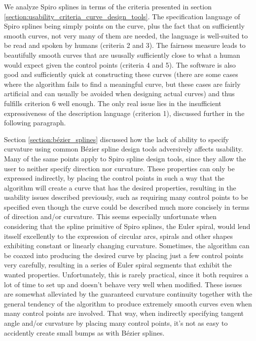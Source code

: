 \documentclass[a4paper]{article}
\begin{document}
				We analyze Spiro splines in terms of the criteria presented in section \ref{section:usability_criteria_curve_design_tools}. The specification language of Spiro splines being simply points on the curve, plus the fact that on sufficiently smooth curves, not very many of them are needed, the language is well-suited to be read and spoken by humans (criteria 2 and 3). The fairness measure leads to beautifully smooth curves that are ususally sufficiently close to what a human would expect given the control points (criteria 4 and 5). The software is also good and sufficiently quick at constructing these curves (there are some cases where the algorithm fails to find a meaningful curve, but these cases are fairly artificial and can usually be avoided when designing actual curves) and thus fulfills criterion 6 well enough. The only real issue lies in the insufficient expressiveness of the description language (criterion 1), discussed further in the following paragraph.

				Section \ref{section:bézier_splines} discussed how the lack of ability to specify curvature using common Bézier spline design tools adversively affects usability. Many of the same points apply to Spiro spline design tools, since they allow the user to neither specify direction nor curvature. These properties can only be expressed indirectly, by placing the control points in such a way that the algorithm will create a curve that has the desired properties, resulting in the usability issues described previously, such as requiring many control points to be specified even though the curve could be described much more concisely in terms of direction and/or curvature. This seems especially unfortunate when considering that the spline primitive of Spiro splines, the Euler spiral, would lend itsself excellently to the expression of circular arcs, spirals and other shapes exhibiting constant or linearly changing curvature. Sometimes, the algorithm can be coaxed into producing the desired curve by placing just a few control points very carefully, resulting in a series of Euler spiral segments that exhibit the wanted properties. Unfortunately, this is rarely practical, since it both requires a lot of time to set up and doesn't behave very well when modified. These issues are somewhat alleviated by the guaranteed curvature continuity together with the general tendency of the algorithm to produce extremely smooth curves even when many control points are involved. That way, when indirectly specifying tangent angle and/or curvature by placing many control points, it's not as easy to accidently create small bumps as with Bézier splines.
\end{document}
